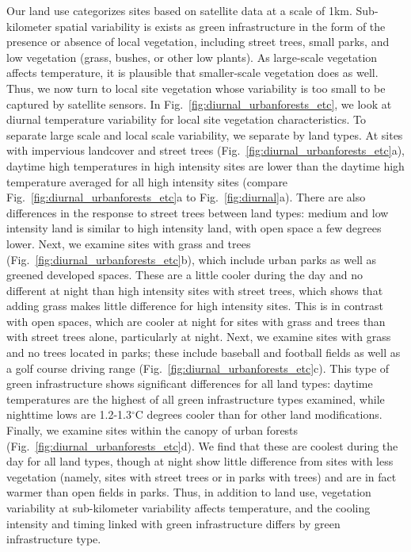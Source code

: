 \documentclass[draft,linenumbers]{agujournal}
\begin{document}
Our land use categorizes sites based on satellite data at a scale of 1km.  Sub-kilometer spatial variability is exists as green infrastructure in the form of the presence or absence of local vegetation, including street trees, small parks, and low vegetation (grass, bushes, or other low plants). As large-scale vegetation affects temperature, it is plausible that smaller-scale vegetation does as well. 
Thus, we now turn to local site vegetation whose variability is too small to be captured by satellite sensors. 
In Fig.~\ref{fig:diurnal_urbanforests_etc}, we look at diurnal temperature variability for local site vegetation characteristics. To separate large scale and local scale variability, we separate by land types. 
At sites with impervious landcover and street trees (Fig.~\ref{fig:diurnal_urbanforests_etc}a), %
daytime high temperatures in high intensity sites are lower than the daytime high temperature averaged for all high intensity sites (compare Fig.~\ref{fig:diurnal_urbanforests_etc}a to Fig.~\ref{fig:diurnal}a).
There are also differences in the response to street trees between land types: 
medium and low intensity land is similar to high intensity land, with open space a few degrees lower. 
Next, we examine sites with grass and trees (Fig.~\ref{fig:diurnal_urbanforests_etc}b), which include urban parks as well as greened developed spaces. These are a little cooler during the day and no different at night than high intensity sites with street trees, which shows that adding grass makes little difference for high intensity sites. This is in contrast with open spaces, which are cooler at night for sites with grass and trees than with street trees alone, particularly at night. Next, we examine sites with grass and no trees located in parks; these include baseball and football fields as well as a golf course driving range (Fig.~\ref{fig:diurnal_urbanforests_etc}c). 
This type of green infrastructure shows significant differences for all land types: daytime temperatures are the highest of all green infrastructure types examined, while nighttime lows are 1.2-1.3$^\circ$C degrees cooler than for other land modifications. 
Finally, we examine sites within the canopy of urban forests (Fig.~\ref{fig:diurnal_urbanforests_etc}d). 
We find that these are coolest during the day for all land types, though at night show little difference from sites with less vegetation (namely, sites with street trees or in parks with trees) and are in fact warmer than open fields in parks. 
Thus, in addition to land use, vegetation variability at sub-kilometer variability affects temperature, and the cooling intensity and timing linked with green infrastructure differs by green infrastructure type. 
\end{document}
